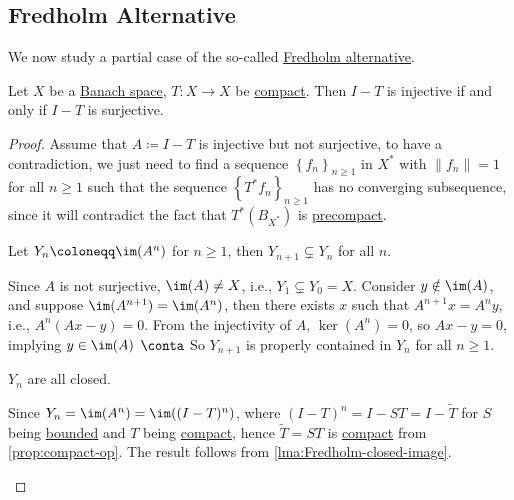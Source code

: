 \subsection{Fredholm Alternative}
We now study a partial case of the so-called \hyperref[thm:Fredholm-alternative]{Fredholm alternative}.

\begin{theorem}\label{thm:Fredholm-alternative}
	Let \(X\) be a \hyperref[def:Banach-space]{Banach space}, \(T\colon X\to  X\) be \hyperref[def:compact-op]{compact}. Then \(I - T\) is injective if and only if \(I - T\) is surjective.
\end{theorem}
\begin{proof}
	Assume that \(A\coloneqq I - T\) is injective but not surjective, to have a contradiction, we just need to find a sequence \(\left\{ f_{n}  \right\}_{n\geq 1} \) in \(X^{\ast} \) with \(\lVert f_{n}  \rVert = 1\) for all \(n\geq 1\) such that the sequence \(\left\{ T^{\ast} f_n \right\}_{n\geq 1} \) has no converging subsequence, since it will contradict the fact that \(T^{\ast} (B_{X^{\ast} })\) is \hyperref[def:precompact]{precompact}.

	\begin{claim}
		Let \(Y_n \coloneqq \im(A^n)\) for \(n\geq 1\), then \(Y_{n+ 1} \subsetneq Y_n\) for all \(n\).
	\end{claim}
	\begin{explanation}
		Since \(A\) is not surjective, \(\im(A) \neq X\), i.e., \(Y_1 \subsetneq Y_0 = X\). Consider \(y \notin \im(A)\), and suppose \(\im(A^{n+1})= \im(A^n)\), then there exists \(x\) such that \(A^{n+1}x = A^n y\), i.e., \(A^n (Ax - y) = 0\). From the injectivity of \(A\), \(\ker(A^n) = 0\), so \(Ax - y = 0\), implying \(y\in \im(A)\) \(\conta\) So \(Y_{n+1}\) is properly contained in \(Y_n\) for all \(n\geq 1\).
	\end{explanation}

	\begin{claim}
		\(Y_n\) are all closed.
	\end{claim}
	\begin{explanation}
		Since \(Y_n = \im(A^n) = \im((I-T)^n)\), where \((I-T)^n = I - ST = I - \widetilde{T}\) for \(S\) being \hyperref[def:bounded-map]{bounded} and \(T\) being \hyperref[def:compact-op]{compact}, hence \(\widetilde{T} = ST\) is \hyperref[def:compact-op]{compact} from \autoref{prop:compact-op}. The result follows from \autoref{lma:Fredholm-closed-image}.
	\end{explanation}


\end{proof}

